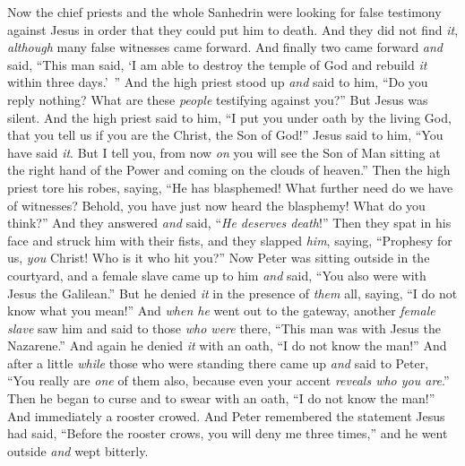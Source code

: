 \begin{biblechapter}
\verse Now the chief priests and the whole Sanhedrin were looking for false testimony against Jesus in order that they could put him to death.
\verse And they did not find \textit{it}, \textit{although} many false witnesses came forward. And finally two came forward
\verse \textit{and} said, “This man said, ‘I am able to destroy the temple of God and rebuild \textit{it} within three days.’ ”
\verse And the high priest stood up \textit{and} said to him, “Do you reply nothing? What are these \textit{people} testifying against you?”
\verse But Jesus was silent. And the high priest said to him, “I put you under oath by the living God, that you tell us if you are the Christ, the Son of God!”
\verse Jesus said to him, “You have said \textit{it}. But I tell you, from now \textit{on} you will see the Son of Man sitting at the right hand of the Power and coming on the clouds of heaven.”
\verse Then the high priest tore his robes, saying, “He has blasphemed! What further need do we have of witnesses? Behold, you have just now heard the blasphemy!
\verse What do you think?” And they answered \textit{and} said, “\textit{He deserves death}!”
\verse Then they spat in his face and struck him with their fists, and they slapped \textit{him},
\verse saying, “Prophesy for us, \textit{you} Christ! Who is it who hit you?”
 Now Peter was sitting outside in the courtyard, and a female slave came up to him \textit{and} said, “You also were with Jesus the Galilean.”
\verse But he denied \textit{it} in the presence of \textit{them} all, saying, “I do not know what you mean!”
\verse And \textit{when he} went out to the gateway, another \textit{female slave} saw him and said to those \textit{who were} there, “This man was with Jesus the Nazarene.”
\verse And again he denied \textit{it} with an oath, “I do not know the man!”
\verse And after a little \textit{while} those who were standing there came up \textit{and} said to Peter, “You really are \textit{one} of them also, because even your accent \textit{reveals who you are}.”
\verse Then he began to curse and to swear with an oath, “I do not know the man!” And immediately a rooster crowed.
\verse And Peter remembered the statement Jesus had said, “Before the rooster crows, you will deny me three times,” and he went outside \textit{and} wept bitterly.
\end{biblechapter}

